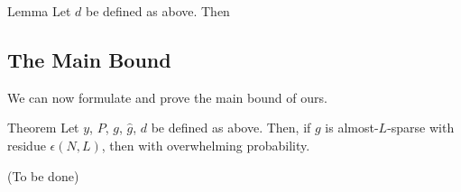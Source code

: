 \Result
{Lemma}
{
Let \(d\) be defined as above.
Then
%
%
}

\subsection{The Main Bound}

We can now formulate and prove the main bound of ours.

\Result
{Theorem}
{
Let \(y\), \(P\), \(g\), \(\hat{g}\), \(d\) be defined as above.
Then, if \(g\) is almost-\(L\)-sparse with residue \(\epsilon(N,L)\), then
with overwhelming probability.
}



{ \color{red} (To be done) }
